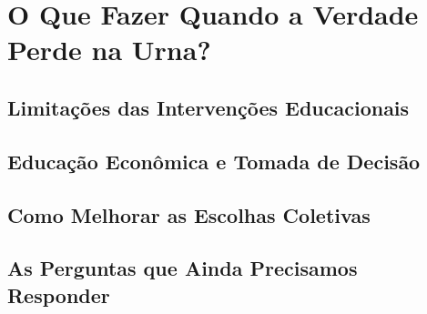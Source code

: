 

\chapter{O Que Fazer Quando a Verdade Perde na Urna?} %


\section{Limitações das Intervenções Educacionais} %


\section{Educação Econômica e Tomada de Decisão} %


\section{Como Melhorar as Escolhas Coletivas} %


\section{As Perguntas que Ainda Precisamos Responder} %

